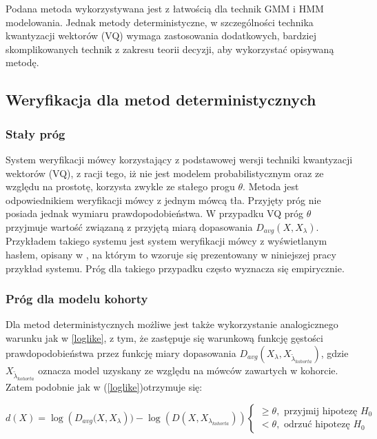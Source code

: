 Podana metoda wykorzystywana jest z łatwością dla technik GMM i HMM modelowania. Jednak metody deterministyczne, w szczególności technika kwantyzacji wektorów (VQ) wymaga zastosowania dodatkowych, bardziej skomplikowanych technik z zakresu teorii decyzji, aby wykorzystać opisywaną metodę. 

\subsection{Weryfikacja dla metod deterministycznych}
\subsubsection{Stały próg}
\label{fixed}
System weryfikacji mówcy korzystający z podstawowej wersji techniki kwantyzacji wektorów (VQ), z racji tego, iż nie jest modelem probabilistycznym oraz ze względu na prostotę, korzysta zwykle ze stałego progu $\theta$. Metoda jest odpowiednikiem weryfikacji mówcy z jednym mówcą tła. Przyjęty próg nie posiada jednak wymiaru prawdopodobieństwa. W przypadku VQ próg $\theta$ przyjmuje wartość związaną z przyjętą miarą dopasowania $D_{avg}(X, X_{\lambda})$. Przykładem takiego systemu jest system weryfikacji mówcy z wyświetlanym hasłem, opisany w \cite{10digits92}, na którym to wzoruje się prezentowany w niniejszej pracy przykład systemu. Próg dla takiego przypadku często wyznacza się empirycznie. 

\subsubsection{Próg dla modelu kohorty}
Dla metod deterministycznych możliwe jest także wykorzystanie analogicznego warunku jak w \ref{loglike}, z tym, że zastępuje się warunkową funkcję gęstości prawdopodobieństwa przez funkcję miary dopasowania $D_{avg}(X_{\lambda}, X_{\tilde{\lambda}_{kohorta}})$, gdzie $X_{\tilde{\lambda}_{kohorta}}$ oznacza model uzyskany ze względu na mówców zawartych w kohorcie. Zatem podobnie jak w (\ref{loglike})otrzymuje się:

\begin{equation}
  \label{loglikedis}
  d(X)= \log({D_{avg} (X, X_{\lambda}})) - \log(D(X, X_{\lambda_{kohorta}}))
  \begin{cases}
    \ge \theta, \textrm{ przyjmij hipotezę } H_0 \\
    < \theta, \textrm{ odrzuć hipotezę } H_0
  \end{cases}
\end{equation}

